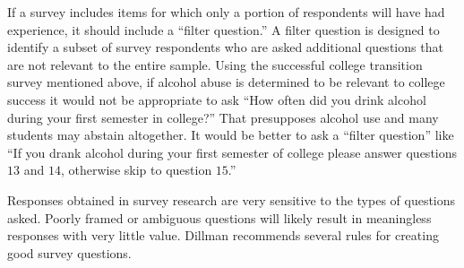 If a survey includes items for which only a portion of respondents will have had experience, it should include a ``filter question.'' A filter question is designed to identify a subset of survey respondents who are asked additional questions that are not relevant to the entire sample. Using the successful college transition survey mentioned above, if alcohol abuse is determined to be relevant to college success it would not be appropriate to ask ``How often did you drink alcohol during your first semester in college?'' That presupposes alcohol use and many students may abstain altogether. It would be better to ask a ``filter question'' like ``If you drank alcohol during your first semester of college please answer questions $ 13 $ and $ 14 $, otherwise skip to question $ 15 $.'' 

Responses obtained in survey research are very sensitive to the types of questions asked. Poorly framed or ambiguous questions will likely result in meaningless responses with very little value. Dillman\cite{dillman2011mail} recommends several rules for creating good survey questions.

